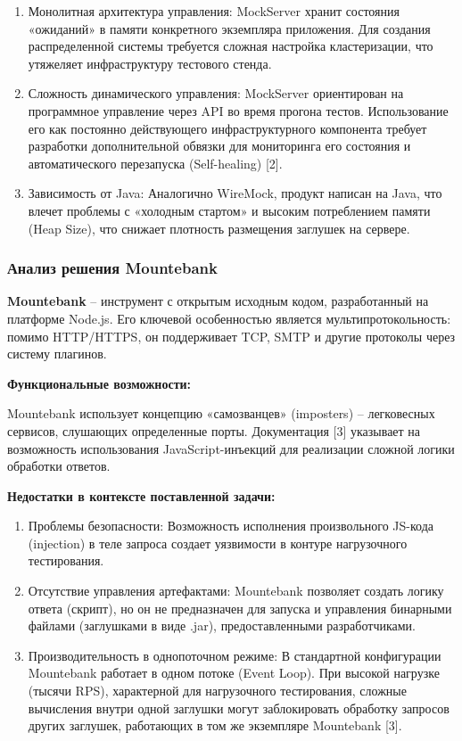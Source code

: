\documentclass[
]{article}
\begin{document}
\begin{enumerate}
\def\labelenumi{\arabic{enumi}.}
\item
  Монолитная архитектура управления: MockServer хранит состояния
  «ожиданий» в памяти конкретного экземпляра приложения. Для создания
  распределенной системы требуется сложная настройка кластеризации, что
  утяжеляет инфраструктуру тестового стенда.
\item
  Сложность динамического управления: MockServer ориентирован на
  программное управление через API во время прогона тестов.
  Использование его как постоянно действующего инфраструктурного
  компонента требует разработки дополнительной обвязки для мониторинга
  его состояния и автоматического перезапуска (Self-healing) {[}2{]}.
\item
  Зависимость от Java: Аналогично WireMock, продукт написан на Java, что
  влечет проблемы с «холодным стартом» и высоким потреблением памяти
  (Heap Size), что снижает плотность размещения заглушек на сервере.
\end{enumerate}

\subsubsection{Анализ решения
Mountebank}\label{ux430ux43dux430ux43bux438ux437-ux440ux435ux448ux435ux43dux438ux44f-mountebank}

\textbf{Mountebank} -- инструмент с открытым исходным кодом,
разработанный на платформе Node.js. Его ключевой особенностью является
мультипротокольность: помимо HTTP/HTTPS, он поддерживает TCP, SMTP и
другие протоколы через систему плагинов.

\textbf{Функциональные возможности:}

Mountebank использует концепцию «самозванцев» (imposters) -- легковесных
сервисов, слушающих определенные порты. Документация {[}3{]} указывает
на возможность использования JavaScript-инъекций для реализации сложной
логики обработки ответов.

\textbf{Недостатки в контексте поставленной задачи:}

\begin{enumerate}
\def\labelenumi{\arabic{enumi}.}
\item
  Проблемы безопасности: Возможность исполнения произвольного JS-кода
  (injection) в теле запроса создает уязвимости в контуре нагрузочного
  тестирования.
\item
  Отсутствие управления артефактами: Mountebank позволяет создать логику
  ответа (скрипт), но он не предназначен для запуска и управления
  бинарными файлами (заглушками в виде .jar), предоставленными
  разработчиками.
\item
  Производительность в однопоточном режиме: В стандартной конфигурации
  Mountebank работает в одном потоке (Event Loop). При высокой нагрузке
  (тысячи RPS), характерной для нагрузочного тестирования, сложные
  вычисления внутри одной заглушки могут заблокировать обработку
  запросов других заглушек, работающих в том же экземпляре Mountebank
  {[}3{]}.
\end{enumerate}
\end{document}

